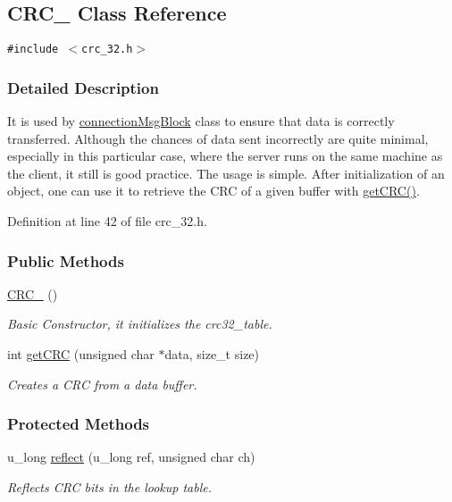 \hypertarget{classCRC__32}{
\subsection{CRC\_ Class Reference}
\label{classCRC__32}
}
{\tt \#include $<$crc\_\-32.h$>$}



\subsubsection{Detailed Description}
It is used by \hyperlink{classconnectionMsgBlock}{connection\-Msg\-Block} class to ensure that data is correctly transferred. Although the chances of data sent incorrectly are quite minimal, especially in this particular case, where the server runs on the same machine as the client, it still is good practice. The usage is simple. After initialization of an object, one can use it to retrieve the CRC of a given buffer with \hyperlink{classCRC__32_CRC__32a1}{get\-CRC()}. 



Definition at line 42 of file crc\_\-32.h.\subsubsection*{Public Methods}
\begin{CompactItemize}
\item 
\hyperlink{classCRC__32_CRC__32a0}{CRC\_} ()
\begin{CompactList}\small\item\em Basic Constructor, it initializes the crc32\_\-table.\item\end{CompactList}\item 
int \hyperlink{classCRC__32_CRC__32a1}{get\-CRC} (unsigned char $\ast$data, size\_\-t size)
\begin{CompactList}\small\item\em Creates a CRC from a data buffer.\item\end{CompactList}\end{CompactItemize}
\subsubsection*{Protected Methods}
\begin{CompactItemize}
\item 
u\_\-long \hyperlink{classCRC__32_CRC__32b0}{reflect} (u\_\-long ref, unsigned char ch)
\begin{CompactList}\small\item\em Reflects CRC bits in the lookup table.\item\end{CompactList}\end{CompactItemize}
